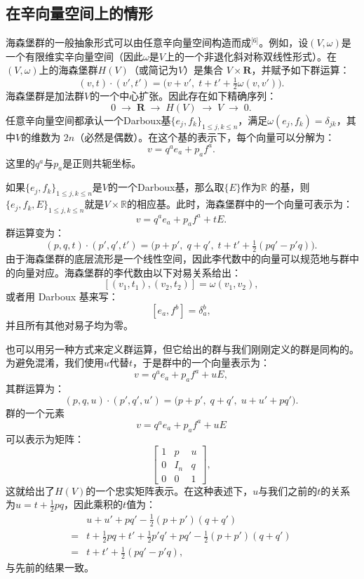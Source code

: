\subsection{在辛向量空间上的情形}
海森堡群的一般抽象形式可以由任意辛向量空间构造而成\(^\text{[6]}\)。例如，设$(V, \omega)$是一个有限维实辛向量空间（因此$\omega$是$V$上的一个非退化斜对称双线性形式）。在$(V, \omega)$上的海森堡群$H(V)$（或简记为$V$）是集合 $V \times \mathbf{R}$，并赋予如下群运算：
$$
(v, t) \cdot (v', t') = \big(v + v', \; t + t' + \tfrac{1}{2}\omega(v, v')\big).~
$$
海森堡群是加法群$V$的一个中心扩张。因此存在如下精确序列：
$$
0 \;\longrightarrow\; \mathbf{R} \;\longrightarrow\; H(V) \;\longrightarrow\; V \;\longrightarrow\; 0.~
$$
任意辛向量空间都承认一个Darboux基$\{e_{j}, f_{k}\}_{1 \le j,k \le n}$，满足$\omega(e_{j}, f_{k}) = \delta_{jk}$，其中$V$的维数为 $2n$（必然是偶数）。在这个基的表示下，每个向量可以分解为：
$$
v = q^{a} e_{a} + p_{a} f^{a}.~
$$
这里的$q^{a}$与$p_{a}$是正则共轭坐标。

如果$\{e_{j}, f_{k}\}_{1 \leq j,k \leq n}$是$V$的一个Darboux基，那么取$\{E\}$作为$\mathbb{R}$ 的基，则$\{e_{j}, f_{k}, E\}_{1 \leq j,k \leq n}$就是$V \times \mathbb{R}$的相应基。此时，海森堡群中的一个向量可表示为：
$$
v = q^{a} e_{a} + p_{a} f^{a} + tE.~
$$
群运算变为：
$$
(p, q, t) \cdot (p', q', t') = \big(p + p',\; q + q',\; t + t' + \tfrac{1}{2}(pq' - p'q)\big).~
$$
由于海森堡群的底层流形是一个线性空间，因此李代数中的向量可以规范地与群中的向量对应。海森堡群的李代数由以下对易关系给出：
$$
[(v_{1}, t_{1}), (v_{2}, t_{2})] = \omega(v_{1}, v_{2}),~
$$
或者用 Darboux 基来写：
$$
[e_{a}, f^{b}] = \delta_{a}^{b},~
$$
并且所有其他对易子均为零。

也可以用另一种方式来定义群运算，但它给出的群与我们刚刚定义的群是同构的。为避免混淆，我们使用$u$代替$t$，于是群中的一个向量表示为：
$$
v = q^{a} e_{a} + p_{a} f^{a} + uE,~
$$
其群运算为：
$$
(p, q, u) \cdot (p', q', u') = \big(p + p',\; q + q',\; u + u' + pq'\big).~
$$
群的一个元素
$$
v = q^{a} e_{a} + p_{a} f^{a} + uE~
$$
可以表示为矩阵：
$$
\begin{bmatrix}
1 & p & u \\
0 & I_{n} & q \\
0 & 0 & 1
\end{bmatrix},~
$$
这就给出了$H(V)$的一个忠实矩阵表示。在这种表述下，$u$与我们之前的$t$的关系为$u = t + \tfrac{1}{2}pq$，因此乘积的$t$值为：
$$
\begin{aligned}
&u + u' + pq' - \tfrac{1}{2}(p+p')(q+q') \\
={}& t + \tfrac{1}{2}pq + t' + \tfrac{1}{2}p'q' + pq' - \tfrac{1}{2}(p+p')(q+q') \\
={}& t + t' + \tfrac{1}{2}(pq' - p'q),
\end{aligned}~
$$
与先前的结果一致。

